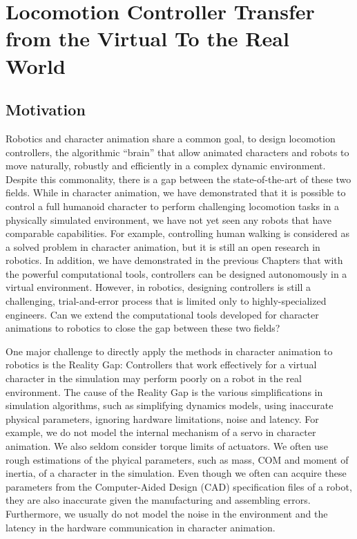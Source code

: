 \chapter{Locomotion Controller Transfer from the Virtual To the Real World}
\section{Motivation}
Robotics and character animation share a common goal, to design locomotion controllers, the algorithmic ``brain'' that allow animated characters and robots to move naturally, robustly and efficiently in a complex dynamic environment. Despite this commonality, there is a gap between the state-of-the-art of these two fields. While in character animation, we have demonstrated that it is possible to control a full humanoid character to perform challenging locomotion tasks in a physically simulated environment, we have not yet seen any robots that have comparable capabilities. For example, controlling human walking is considered as a solved problem in character animation, but it is still an open research in robotics. In addition, we have demonstrated in the previous Chapters that with the powerful computational tools, controllers can be designed autonomously in a virtual environment. However, in robotics, designing controllers is still a challenging, trial-and-error process that is limited only to highly-specialized engineers. Can we extend the computational tools developed for character animations to robotics to close the gap between these two fields?

One major challenge to directly apply the methods in character animation to robotics is the Reality Gap: Controllers that work effectively for a virtual character in the simulation may perform poorly on a robot in the real environment. The cause of the Reality Gap is the various simplifications in simulation algorithms, such as simplifying dynamics models, using inaccurate physical parameters, ignoring hardware limitations, noise and latency. For example, we do not model the internal mechanism of a servo in character animation. We also seldom consider torque limits of actuators. We often use rough estimations of the phyical parameters, such as mass, COM and moment of inertia, of a character in the simulation. Even though we often can acquire these parameters from the Computer-Aided Design (CAD) specification files of a robot, they are also inaccurate given the manufacturing and assembling errors. Furthermore, we usually do not model the noise in the environment and the latency in the hardware communication in character animation.

